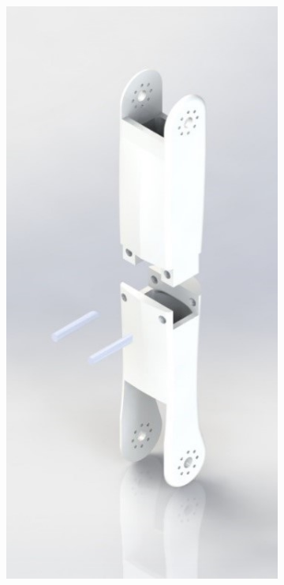 \begin{figure}[!ht]
    \centering
    \begin{subfigure}[b]{0.3\linewidth}
      \includegraphics[width=\linewidth]{chapter4/images/shin.jpg}

\end{subfigure}
\end{figure}
